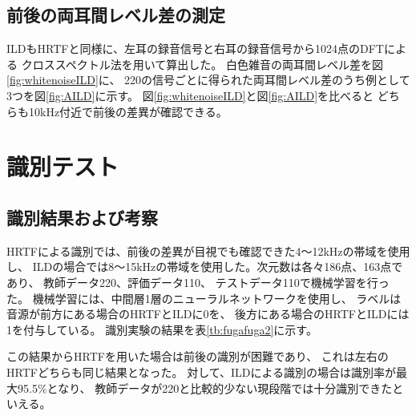 \documentclass[autodetect-engine,dvi=dvipdfmx,ja=standard,twocolumn,jbase=13.35Q]{bxjsarticle}
\begin{document}
\subsection{前後の両耳間レベル差の測定}
ILDもHRTFと同様に、左耳の録音信号と右耳の録音信号から1024点のDFTによる
クロススペクトル法を用いて算出した。
白色雑音の両耳間レベル差を図\ref{fig:whitenoiseILD}に、
220の信号ごとに得られた両耳間レベル差のうち例として3つを図\ref{fig:AILD}に示す。
図\ref{fig:whitenoiseILD}と図\ref{fig:AILD}を比べると
どちらも10kHz付近で前後の差異が確認できる。

  


\section{識別テスト}

\subsection{識別結果および考察}
HRTFによる識別では、前後の差異が目視でも確認できた4〜12kHzの帯域を使用し、
ILDの場合では8〜15kHzの帯域を使用した。次元数は各々186点、163点であり、
教師データ220、評価データ110、
テストデータ110で機械学習を行った。
機械学習には、中間層1層のニューラルネットワークを使用し、
ラベルは音源が前方にある場合のHRTFとILDに0を、
後方にある場合のHRTFとILDには1を付与している。
識別実験の結果を表\ref{tb:fugafuga2}に示す。



この結果からHRTFを用いた場合は前後の識別が困難であり、
これは左右のHRTFどちらも同じ結果となった。
対して、ILDによる識別の場合は識別率が最大95.5\%となり、
教師データが220と比較的少ない現段階では十分識別できたといえる。
\end{document}
